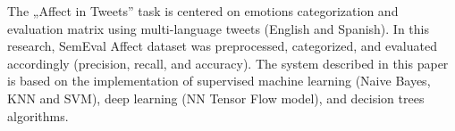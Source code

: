 The „Affect in Tweets'' task is centered on emotions categorization and evaluation matrix using multi-language tweets (English and Spanish). In this research, SemEval Affect dataset was preprocessed, categorized, and evaluated accordingly (precision, recall, and accuracy). The system described in this paper is based on the implementation of supervised machine learning (Naive Bayes, KNN and SVM), deep learning (NN Tensor Flow model), and decision trees algorithms.
